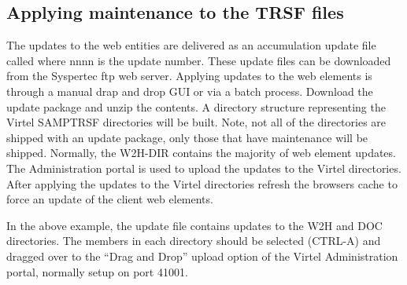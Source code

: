 \documentclass[letterpaper,10pt,english]{sphinxmanual}
\begin{document}
\begin{sphinxVerbatim}[commandchars=\\\{\}]
       
 
      
\end{sphinxVerbatim}

\ignorespaces 

\subsection{Applying maintenance to the TRSF files}
\label{\detokenize{audit_operations_ and_performance:applying-maintenance-to-the-trsf-files}}\label{\detokenize{audit_operations_ and_performance:index-46}}
The updates to the web entities are delivered as an accumulation update file called  where nnnn is the update number. These update files can be downloaded from the Syspertec ftp web server. Applying updates to the web elements is through a manual drap and drop GUI or via a batch process. Download the update package and unzip the contents. A directory structure representing the Virtel SAMPTRSF directories will be built. Note, not all of the directories are shipped with an update package, only those that have maintenance will be shipped. Normally, the W2H-DIR contains the majority of web element updates. The Administration portal is used to upload the updates to the Virtel directories. After applying the updates to the Virtel directories refresh the browsers cache to force an update of the client web elements.



In the above example, the update file contains updates to the W2H and DOC directories. The members in each directory should be selected (CTRL-A) and dragged over to the “Drag and Drop” upload option of the Virtel Administration portal, normally setup on port 41001.
\end{document}

